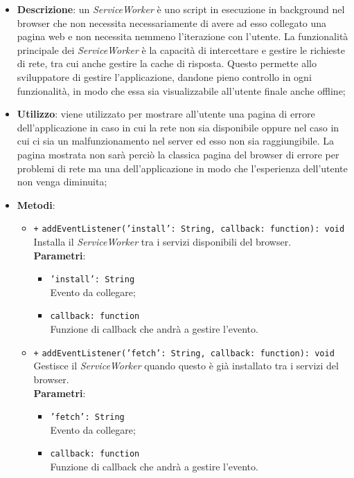 		\begin{itemize}

			\item \textbf{Descrizione}: un \textit{ServiceWorker} è uno script in esecuzione in background nel browser che non necessita necessariamente di avere ad esso collegato una pagina web e non necessita nemmeno l'iterazione con l'utente. La funzionalità principale dei \textit{ServiceWorker} è la capacità di intercettare e gestire le richieste di rete, tra cui anche gestire la cache di risposta. 
			Questo permette allo sviluppatore di gestire l'applicazione, dandone pieno controllo in ogni funzionalità, in modo che essa sia visualizzabile all'utente finale anche offline;
			\item \textbf{Utilizzo}: viene utilizzato per mostrare all'utente una pagina di errore dell'applicazione in caso in cui la rete non sia disponibile oppure nel caso in cui ci sia un malfunzionamento nel server ed esso non sia raggiungibile. La pagina mostrata non sarà perciò la classica pagina del browser di errore per problemi di rete ma una dell'applicazione in modo che l'esperienza dell'utente non venga diminuita;

			\item \textbf{Metodi}: 
			\begin{itemize}

				\item \texttt{+} \texttt{addEventListener('install': String, callback: function): void} \\ 
				Installa il \textit{ServiceWorker} tra i servizi disponibili del browser.
				\\
				\textbf{Parametri}:
				\begin{itemize}
					\item \texttt{'install': String}\\ Evento da collegare;
					\item \texttt{callback: function}\\ Funzione di callback che andrà a gestire l'evento.						
				\end{itemize}	
				\item \texttt{+} \texttt{addEventListener('fetch': String, callback: function): void} \\
				Gestisce il \textit{ServiceWorker} quando questo è già installato tra i servizi del browser.
				\\
				\textbf{Parametri}:
				\begin{itemize}
					\item \texttt{'fetch': String}\\ Evento da collegare;
					\item \texttt{callback: function}\\ Funzione di callback che andrà a gestire l'evento.						
				\end{itemize}	

							
			\end{itemize}
		\end{itemize}
		
